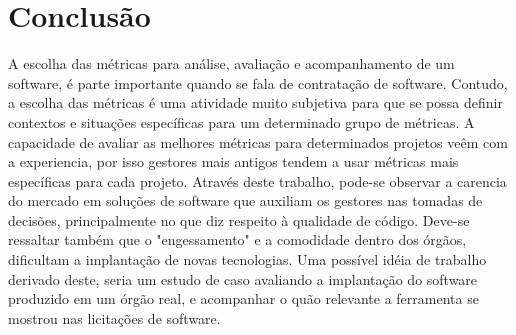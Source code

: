 \section{Conclusão}

A escolha das métricas para análise, avaliação e acompanhamento de um software, é parte importante quando se fala de contratação de software. Contudo, a escolha das métricas é uma atividade muito subjetiva para que se possa definir contextos e situações específicas para um determinado grupo de métricas. A capacidade de avaliar as melhores métricas para determinados projetos veêm com a experiencia, por isso gestores mais antigos tendem a usar métricas mais específicas para cada projeto. 
Através deste trabalho, pode-se observar a carencia do mercado em soluções de software que auxiliam os gestores nas tomadas de decisões, principalmente no que diz respeito à qualidade de código. Deve-se ressaltar também que o "engessamento" e a comodidade dentro dos órgãos, dificultam a implantação de novas tecnologias.
Uma possível idéia de trabalho derivado deste, seria um estudo de caso avaliando a implantação do software produzido em um órgão real, e acompanhar o quão relevante a ferramenta se mostrou nas licitações de software.